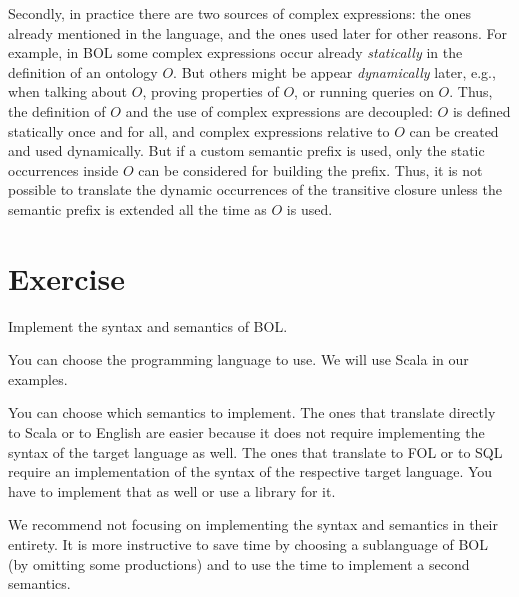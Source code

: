 Secondly, in practice there are two sources of complex expressions: the ones already mentioned in the language, and the ones used later for other reasons.
For example, in BOL some complex expressions occur already \emph{statically} in the definition of an ontology $O$.
But others might be appear \emph{dynamically} later, e.g., when talking about $O$, proving properties of $O$, or running queries on $O$.
Thus, the definition of $O$ and the use of complex expressions are decoupled: $O$ is defined statically once and for all, and complex expressions relative to $O$ can be created and used dynamically.
But if a custom semantic prefix is used, only the static occurrences inside $O$ can be considered for building the prefix.
Thus, it is not possible to translate the dynamic occurrences of the transitive closure unless the semantic prefix is extended all the time as $O$ is used.

\section{Exercise}

Implement the syntax and semantics of BOL.

You can choose the programming language to use. We will use Scala in our examples.

You can choose which semantics to implement.
The ones that translate directly to Scala or to English are easier because it does not require implementing the syntax of the target language as well.
The ones that translate to FOL or to SQL require an implementation of the syntax of the respective target language.
You have to implement that as well or use a library for it.

We recommend not focusing on implementing the syntax and semantics in their entirety.
It is more instructive to save time by choosing a sublanguage of BOL (by omitting some productions) and to use the time to implement a second semantics.